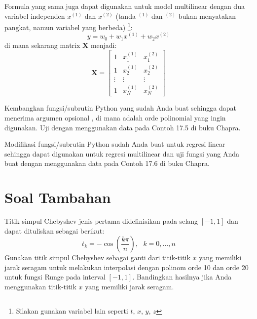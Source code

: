 Formula yang sama juga dapat digunakan untuk model multilinear dengan
dua variabel independen $x^{(1)}$ dan $x^{(2)}$ (tanda $^{(1)}$ dan $^{(2)}$ bukan
menyatakan pangkat, namun variabel yang berbeda)
\footnote{Silakan gunakan variabel lain seperti $t$, $x$, $y$, $z$}:
\begin{equation}
y = w_{0} + w_{1} x^{(1)} + w_{2} x^{(2)}
\end{equation}
di mana sekarang matrix $\mathbf{X}$ menjadi:
\begin{equation}
\mathbf{X} = \begin{bmatrix}
1 & x^{(1)}_{1} & x^{(2)}_{1} \\
1 & x^{(1)}_{2} & x^{(2)}_{2} \\
\vdots & \vdots & \vdots \\
1 & x^{(1)}_{N} & x^{(2)}_{N}
\end{bmatrix}
\end{equation}

\begin{soal}
Kembangkan fungsi/subrutin Python yang sudah Anda buat sehingga dapat menerima argumen
opsional , di mana  adalah orde polinomial yang ingin digunakan.
Uji dengan menggunakan data pada Contoh 17.5 di buku Chapra.
\end{soal}

\begin{soal}
Modifikasi fungsi/subrutin Python sudah Anda buat untuk regresi linear sehingga
dapat digunakan untuk regresi multilinear dan uji fungsi yang Anda buat
dengan menggunakan data pada Contoh 17.6 di buku Chapra.
\end{soal}



\section{Soal Tambahan}


















\begin{soal}
Titik simpul Chebyshev jenis pertama didefinisikan pada selang $[-1,1]$ dan
dapat dituliskan sebagai berikut:
\begin{equation}
t_{k} = -\cos\left( \frac{k\pi}{n} \right), \,\,\,\, k = 0, \ldots, n
\end{equation}
Gunakan titik simpul Chebyshev sebagai ganti dari titik-titik $x$ yang memiliki jarak seragam
untuk melakukan interpolasi dengan polinom orde 10 dan orde 20 untuk fungsi Runge
pada interval $[-1,1]$.
Bandingkan hasilnya jika Anda menggunakan titik-titik $x$ yang memiliki jarak
seragam.
\end{soal}


